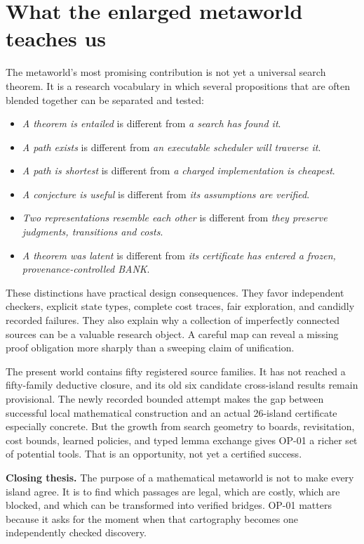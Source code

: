 \documentclass[11pt,letterpaper,oneside]{article}
\begin{document}
\section{What the enlarged metaworld teaches us}
The metaworld's most promising contribution is not yet a universal search theorem. It is a research vocabulary in which several propositions that are often blended together can be separated and tested:
\begin{itemize}
\item \emph{A theorem is entailed} is different from \emph{a search has found it}.
\item \emph{A path exists} is different from \emph{an executable scheduler will traverse it}.
\item \emph{A path is shortest} is different from \emph{a charged implementation is cheapest}.
\item \emph{A conjecture is useful} is different from \emph{its assumptions are verified}.
\item \emph{Two representations resemble each other} is different from \emph{they preserve judgments, transitions and costs}.
\item \emph{A theorem was latent} is different from \emph{its certificate has entered a frozen, provenance-controlled BANK}.
\end{itemize}
These distinctions have practical design consequences. They favor independent checkers, explicit state types, complete cost traces, fair exploration, and candidly recorded failures. They also explain why a collection of imperfectly connected sources can be a valuable research object. A careful map can reveal a missing proof obligation more sharply than a sweeping claim of unification.

The present world contains fifty registered source families. It has not reached a fifty-family deductive closure, and its old six candidate cross-island results remain provisional. The newly recorded bounded attempt makes the gap between successful local mathematical construction and an actual 26-island certificate especially concrete. But the growth from search geometry to boards, revisitation, cost bounds, learned policies, and typed lemma exchange gives OP-01 a richer set of potential tools. That is an opportunity, not yet a certified success.

\begin{insight}
\textbf{Closing thesis.} The purpose of a mathematical metaworld is not to make every island agree. It is to find which passages are legal, which are costly, which are blocked, and which can be transformed into verified bridges. OP-01 matters because it asks for the moment when that cartography becomes one independently checked discovery.
\end{insight}
\end{document}
